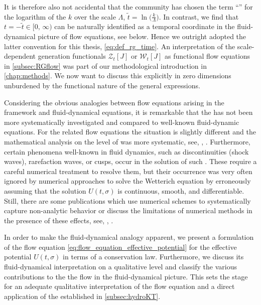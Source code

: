 It is therefore also not accidental that the \grg{} community has chosen the term ``\rgtime{}'' for the logarithm of the \rgscale{} $k$ over the \uv{} scale $\Lambda$, $\tilde{t} = \ln \big( \tfrac{k}{\Lambda} \big)$. 
In contrast, we find that $t = - \tilde{t} \in [ 0, \, \infty )$ can be naturally identified as a temporal coordinate in the fluid-dynamical picture of \grg{} flow equations, see below.
Hence we outright adopted the latter convention for this thesis, \cf{} \cref{eq:def_rg_time}.
An interpretation of the scale-dependent generation functionals $\mathcal{Z}_t [ J ]$ or $\mathcal{W}_t [ J ]$ as functional flow equations in \cref{subsec:RGflow} was part of our methodological introduction in \cref{chap:methods}.
We now want to discuss this explicitly in zero dimensions unburdened by the functional nature of the general expressions.

Considering the obvious analogies between flow equations arising in the \frg{} framework and fluid-dynamical equations, it is remarkable that the \frgEq{} has not been more systematically investigated and compared to well-known fluid-dynamic equations.
For the related \rg{} flow equations the situation is slightly different and the mathematical analysis on the level of \pdes{} was more systematic, see, \eg{}, .
Furthermore, certain phenomena well-known in fluid dynamics, such as discontinuities (shock waves), rarefaction waves, or cusps, occur in the solution of such \pdes{}.
These require a careful numerical treatment to resolve them, but their occurrence was very often ignored by numerical approaches to solve the Wetterich equation by erroneously assuming that the solution $U ( t, \sigma )$ is continuous, smooth, and differentiable.
Still, there are some publications which use numerical schemes to systematically capture non-analytic behavior or discuss the limitations of numerical methods in the presence of these effects, see, \eg{}, .

In order to make the fluid-dynamical analogy apparent, we present a formulation of the \frg{} flow equation \eqref{eq:flow_equation_effective_potential} for the effective potential $U ( t, \sigma )$ in terms of a conservation law.
Furthermore, we discuss its fluid-dynamical interpretation on a qualitative level and classify the various contributions to the \pde{} \dash{} the \grg{} flow \dash{} in the fluid-dynamical picture.
This sets the stage for an adequate qualitative interpretation of the \frg{} flow equation and a direct application of the \ktScheme{} established in \cref{subsec:hydroKT}.\bigskip

